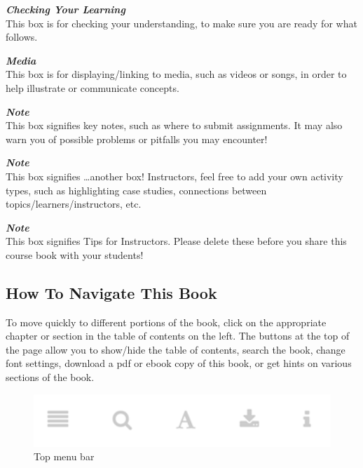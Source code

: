 \documentclass[
]{book}
\begin{document}
\begin{progress}
 \textbf{\emph{Checking Your Learning}}\\
 This box is for checking your understanding, to make sure you are ready
 for what follows.
 \end{progress}

\begin{video}
 \textbf{\emph{Media}}\\
 This box is for displaying/linking to media, such as videos or songs, in
 order to help illustrate or communicate concepts.
 \end{video}

\begin{caution}
 \textbf{\emph{Note}}\\
 This box signifies key notes, such as where to submit assignments. It
 may also warn you of possible problems or pitfalls you may encounter!
 \end{caution}

\begin{bonus}
 \textbf{\emph{Note}}\\
 This box signifies \ldots another box! Instructors, feel free to add
 your own activity types, such as highlighting case studies, connections
 between topics/learners/instructors, etc.
 \end{bonus}

\begin{feedback}
 \textbf{\emph{Note}}\\
 This box signifies Tips for Instructors. Please delete these before you
 share this course book with your students!
 \end{feedback}

\hypertarget{how-to-navigate-this-book}{%
\subsection*{How To Navigate This Book}\label{how-to-navigate-this-book}}

To move quickly to different portions of the book, click on the appropriate chapter or section in the table of contents on the left. The buttons at the top of the page allow you to show/hide the table of contents, search the book, change font settings, download a pdf or ebook copy of this book, or get hints on various sections of the book.

\begin{figure}
 \includegraphics[width=4.56in]{assets/course-intro/menu} \caption{Top menu bar}\label{fig:unnamed-chunk-12}
 \end{figure}
\end{document}
